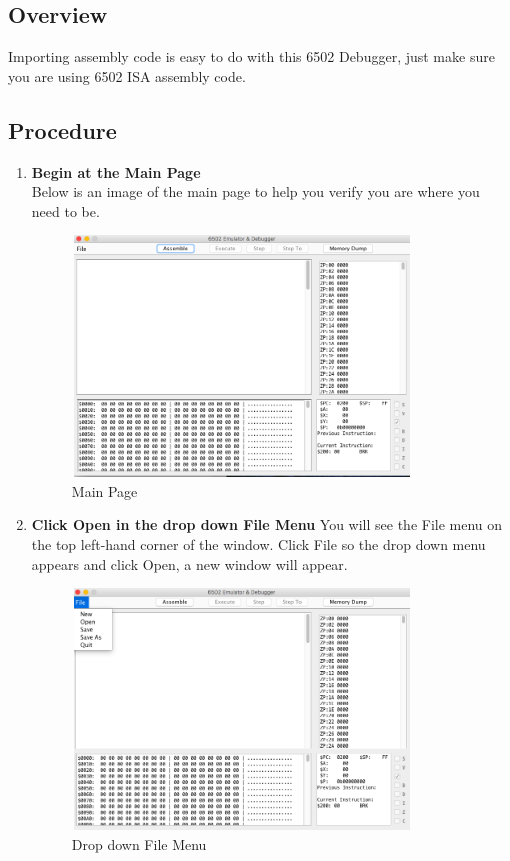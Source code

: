 \documentclass[a3paper, 11pt]{article}
\newlength{\drop}
\begin{document}
\subsection{Overview}
Importing assembly code is easy to do with this 6502 Debugger, just make sure you are using 6502 ISA assembly code.
\subsection{Procedure}
\begin{enumerate}
	\item \textbf{Begin at the Main Page}\\
	Below is an image of the main page to help you verify you are where you need to be.
	\begin{figure}[h!]
		\centering
			\includegraphics[width=9cm, height=6.4cm]{MainPage}
			\caption{Main Page}
	\end{figure}
	\clearpage
	\item \textbf{Click Open in the drop down File Menu}
	You will see the File menu on the top left-hand corner of the window. Click File so the drop down menu appears and click Open, a new window will appear. 
	\begin{figure}[h!]
		\centering
			\includegraphics[width=9cm, height=6.4cm]{FileMenu}
			\caption{Drop down File Menu}

\end{figure}
\end{enumerate}
\end{document}
